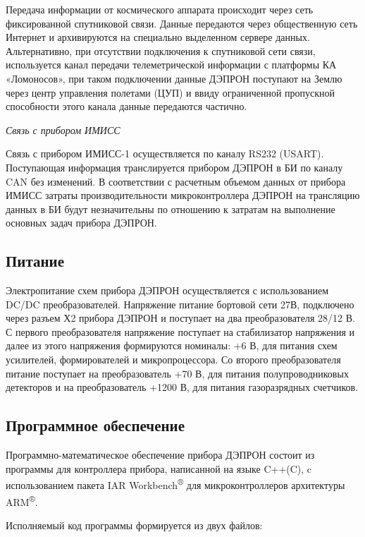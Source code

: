 Передача информации от космического аппарата происходит через сеть фиксированной спутниковой связи. Данные передаются через общественную сеть Интернет и архивируются на специально выделенном сервере данных. Альтернативно, при отсутствии подключения к спутниковой сети связи, используется канал передачи телеметрической информации с платформы КА «Ломоносов», при таком подключении данные ДЭПРОН поступают на Землю через центр управления полетами (ЦУП) и ввиду ограниченной пропускной способности этого канала данные передаются частично.

\emph{Связь с прибором ИМИСС}

Связь с прибором ИМИСС-1 осуществляется по каналу RS232 (USART). Поступающая информация транслируется прибором ДЭПРОН в БИ по каналу CAN без изменений. В соответствии с расчетным объемом данных от прибора ИМИСС затраты производительности микроконтроллера ДЭПРОН на трансляцию данных в БИ будут незначительны по отношению к затратам на выполнение основных задач прибора ДЭПРОН.

\subsection{Питание}

Электропитание схем прибора ДЭПРОН осуществляется с использованием DC/DC преобразователей. Напряжение питание бортовой сети 27В, подключено через разъем Х2 прибора ДЭПРОН и поступает на два преобразователя 28/12 В. С первого преобразователя напряжение поступает на стабилизатор напряжения и далее из этого напряжения формируются номиналы: +6 В, для питания схем усилителей, формирователей и микропроцессора. Со второго преобразователя питание поступает на преобразователь +70 В, для питания полупроводниковых детекторов и на преобразователь +1200 В, для питания газоразрядных счетчиков. 

\subsection{Программное обеспечение}

Программно-математическое обеспечение прибора ДЭПРОН состоит из программы для контроллера прибора, написанной на языке C++(C), c использованием пакета IAR  Workbench\textsuperscript{®} для микроконтроллеров архитектуры ARM\textsuperscript{®}. 


Исполняемый код программы формируется из двух файлов: 


